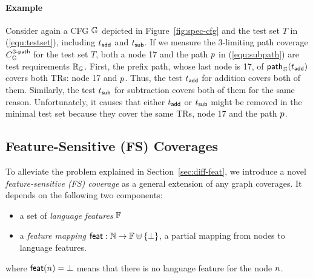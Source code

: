 \paragraph{\textbf{Example}}
%
Consider again a CFG $\mathbb{G}$ depicted in Figure~\ref{fig:spec-cfg} and the test
set $T$ in (\ref{equ:testset}), including $t_{\textsf{add}}$ and $t_{\textsf{sub}}$.
%
If we measure the $3$-limiting path coverage $C_{\mathbb{G}}^{{3}\textsf{-path}}$ for the test
set $T$, both a node 17 and the path $p$ in (\ref{equ:subpath}) are test
requirements $\mathbb{R}_{\mathbb{G}}$.
%
First, the prefix path, whose last node is 17, of $\textsf{path}_{\mathbb{G}}(t_{\textsf{add}})$
covers both TRs: node 17 and $p$.
%
Thus, the test $t_{\textsf{add}}$ for addition covers both of them.
%
Similarly, the test $t_{\textsf{sub}}$ for subtraction covers both of them for the same
reason.
%
Unfortunately, it causes that either $t_{\textsf{add}}$ or $t_{\textsf{sub}}$ might be removed
in the minimal test set because they cover the same TRs, node 17 and the path
$p$.




\subsection{Feature-Sensitive (FS) Coverages}\label{sec:fs-cov}

To alleviate the problem explained in Section~\ref{sec:diff-feat}, we introduce
a novel \textit{feature-sensitive (FS) coverage} as a general extension of any
graph coverages.
%
It depends on the following two components:
%
\begin{itemize}
  \item a set of \textit{language features} $\mathbb{F}$
  \item a \textit{feature mapping} $\textsf{feat}: \mathbb{N} \rightarrow \mathbb{F}
    \uplus \{ \bot \}$, a partial mapping from nodes to language features.
\end{itemize}
%
where $\textsf{feat}(n) = \bot$ means that there is no language feature for the
node $n$.


